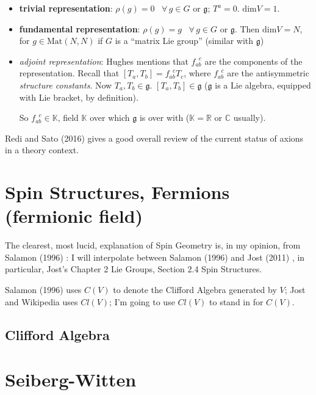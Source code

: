 \documentclass[10pt]{amsart}
\begin{document}
\begin{multicols}{2}
\begin{itemize}
  \item \textbf{trivial representation}: $\rho(g) =0$ \, $\forall \, g\in G$ or $\mathfrak{g}$; $T^a =0$.  $\text{dim}V=1$.  \item \textbf{fundamental representation}: $\rho(g) =g$ \, $\forall \, g\in G$ or $\mathfrak{g}$.  Then $\text{dim}V=N$,  for $g\in \text{Mat}(N,N)$ if $G$ is a ``matrix Lie group'' (similar with $\mathfrak{g}$)   
\item \emph{adjoint representation}: Hughes mentions that $f_{ab}^{ \; \; c}$ are the components of the representation.  Recall that $[T_a,T_b] = f_{ab}^{ \; \; c} T_c$, where $f_{ab}^{ \; \; c}$ are the antisymmetric \emph{structure constants}.  Now $T_a, T_b\in \mathfrak{g}$.  $[T_a,T_b]\in \mathfrak{g}$ ($\mathfrak{g}$ is a Lie algebra, equipped with Lie bracket, by definition).  

So $f_{ab}^{ \; \; c} \in \mathbb{K}$, field $\mathbb{K}$ over which $\mathfrak{g}$ is over with ($\mathbb{K} = \mathbb{R}$ or $\mathbb{C}$ usually).  


\end{itemize}




Redi and Sato (2016) \cite{RS1602} gives a good overall review of the current status of axions in a theory context.



\section{Spin Structures, Fermions (fermionic field) }

The clearest, most lucid, explanation of Spin Geometry is, in my opinion, from Salamon (1996) \cite{Sala1996}: I will interpolate between Salamon (1996) and Jost (2011) \cite{JJost2011}, in particular, Jost's Chapter 2 Lie Groups, Section 2.4 Spin Structures.  

Salamon (1996) \cite{Sala1996} uses $C(V)$ to denote the Clifford Algebra generated by $V$; Jost and Wikipedia uses $Cl(V)$; I'm going to use $Cl(V)$ to stand in for $C(V)$.  

\subsection{Clifford Algebra}


\section{Seiberg-Witten}


\end{multicols}
\end{document}
